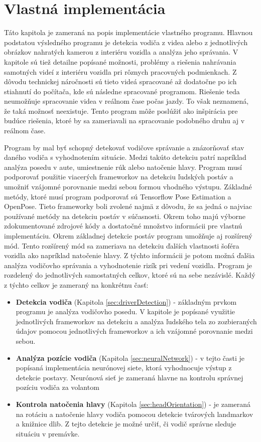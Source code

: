 \documentclass[slovak,master,dept460,male,cpp,cpdeclaration]{diploma}
\begin{document}
\section{Vlastná implementácia}
\label{sec:Vlastná implementácia}
Táto kapitola je zameraná na  popis implementácie vlastného programu. Hlavnou podstatou výsledného programu je detekcia vodiča z videa alebo z jednotlivých obrázkov nahratých kamerou z interiéru vozidla a analýza jeho správania. V kapitole sú tiež detailne popísané možnosti, problémy a riešenia nahrávania samotných videí z interiéru vozidla pri rôznych pracovných podmienkach. Z dôvodu technickej náročnosti sú tieto videá spracované až dodatočne po ich stiahnutí do počítača, kde sú následne spracované  programom. Riešenie teda neumožňuje spracovanie videa v reálnom čase počas jazdy. To však neznamená, že taká možnosť neexistuje. Tento program môže poslúžiť ako inšpirácia pre budúce riešenia, ktoré by sa zameriavali na spracovanie podobného druhu aj v reálnom čase.\par
Program  by mal byť schopný detekovať vodičove správanie a znázorňovať stav daného vodiča s vyhodnotením situácie. Medzi takúto detekciu patrí napríklad analýza posedu v aute, umiestnenie rúk alebo natočenie hlavy. Program musí podporovať použitie viacerých frameworkov na detekciu ľudských postáv a umožniť vzájomné porovnanie medzi sebou formou vhodného výstupu. Základné metódy, ktoré musí program podporovať sú Tensorflow Pose Estimation a OpenPose. Tieto frameworky boli zvolené najmä z dôvodu, že sa jedná o najviac používané metódy na detekciu postáv v súčasnosti. Okrem toho majú výborne zdokumentované zdrojové kódy a dostatočné množstvo informácii pre vlastnú implementáciu. Okrem základnej detekcie postáv program umožňuje aj rozšírený mód. Tento rozšírený mód sa zameriava na detekciu ďalších vlastnosti šoféra vozidla ako napríklad natočenie hlavy. Z týchto informácii je potom možná ďalšia analýza vodičovho správania a vyhodnotenie rizík pri vedení vozidla. Program je rozdelený do jednotlivých samostatných celkov, ktoré sú na sebe nezávislé. Každý z týchto celkov je zameraný na konkrétnu časť:
\begin{itemize}
\item \textbf{Detekcia vodiča} (Kapitola \ref{sec:driverDetection}) - základným prvkom programu je  analýza vodičovho posedu.  V kapitole je popísané využitie jednotlivých frameworkov na detekciu a analýza ľudského tela zo zozbieraných údajov pomocou jednotlivých frameworkov a ich vzájomné porovnanie medzi sebou.

\item \textbf{Analýza pozície vodiča} (Kapitola \ref{sec:neuralNetwork}) - v tejto  časti je popísaná implementácia neurónovej siete, ktorá vyhodnocuje výstup z detekcie postavy. Neurónová sieť je zameraná hlavne  na kontrolu správnej pozíciu vodiča za volantom

\item \textbf{Kontrola natočenia hlavy} (Kapitola \ref{sec:headOrientation}) - je zameraná na rotáciu a natočenie hlavy vodiča pomocou detekcie tvárových landmarkov a knižnice dlib\cite{dlib09}. Z tejto detekcie je možné určiť, či vodič správne sleduje situáciu v premávke.
\end{itemize}
\end{document}
